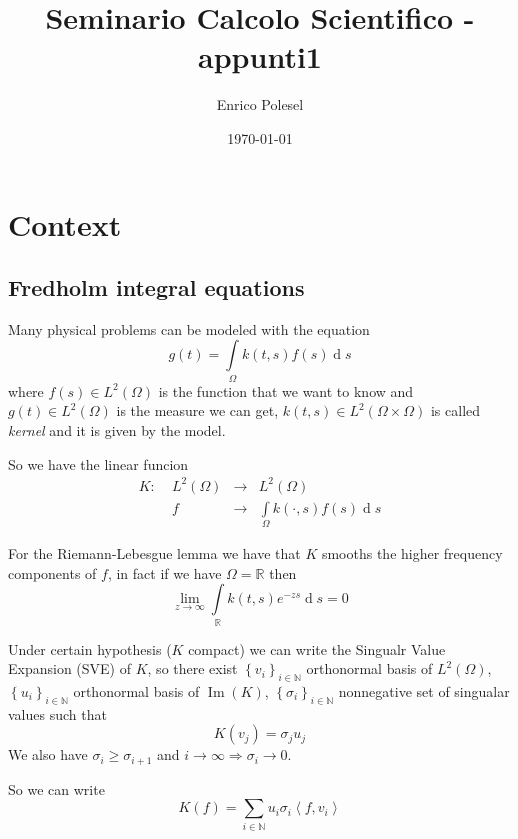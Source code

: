 \documentclass[a4paper,10pt]{article}
\title{Seminario Calcolo Scientifico - appunti1}
\author{Enrico Polesel}
\date{\today}
\theoremstyle{plain}
\theoremstyle{definition}
\theoremstyle{remark}
\newcommand{\set}[1]{\left\{#1\right\}}
\newcommand{\ang}[1]{\left<#1\right>}
\newcommand{\intl}{\int \limits}
\DeclareMathOperator{\de}{d}
\DeclareMathOperator{\im}{Im}
\begin{document}
\maketitle

\section{Context}
\label{sec:context}

\subsection{Fredholm integral equations}
\label{sec:fredholm}

Many physical problems can be modeled with the equation
\begin{equation}
  \label{eq:fredholm}
  g(t) = \intl _{\Omega} k(t,s) f(s) \de s
\end{equation}
where $f(s)\in L^2(\Omega)$ is the function that we want to know and
$g(t)\in L^2(\Omega)$ is the measure we can get, $k(t,s) \in
L^2(\Omega \times \Omega)$ is called \textit{kernel} and it is given
by the model.

So we have the linear funcion
\[ \begin{matrix}
  K:\; &L^2(\Omega) &\longrightarrow &L^2(\Omega)\\
  & f &\longrightarrow & \intl _\Omega k(\cdot , s) f(s) \de s
  \end{matrix}
\]

For the Riemann-Lebesgue lemma we have that $K$ smooths the higher
frequency components of $f$, in fact if we have $\Omega = \mathbb{R}$
then
\[ \lim _{z \to \infty} \intl _\mathbb{R} k(t,s) e^{-zs} \de s = 0 \]

Under certain hypothesis ($K$ compact) we can write the Singualr Value
Expansion (SVE) of $K$, so there exist $\set{v_i}_{i\in \mathbb{N}}$
orthonormal basis of $L^2(\Omega)$, $\set{u_i}_{i\in \mathbb{N}}$
orthonormal basis of $\im(K)$, $\set{\sigma _i}_{i\in \mathbb{N}}$
nonnegative set of singualar values such that
\begin{equation}
  \label{eq:SVErealtion}
  K(v_j) = \sigma _j u_j
\end{equation}
We also have $\sigma _i \ge \sigma _{i+1}$ and $i \to \infty \Rightarrow
\sigma _i \to 0$.

So we can write
\begin{equation}
  \label{eq:SVE}
  K(f) = \sum _{i\in \mathbb{N}} u_i \sigma _i \ang{f,v_i}
\end{equation}
\end{document}
